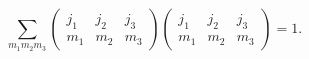 \[\sum_{m_{1}m_{2}m_{3}}\begin{pmatrix}j_{1}&j_{2}&j_{3}\\
m_{1}&m_{2}&m_{3}\end{pmatrix}\begin{pmatrix}j_{1}&j_{2}&j_{3}\\
m_{1}&m_{2}&m_{3}\end{pmatrix}=1.\]